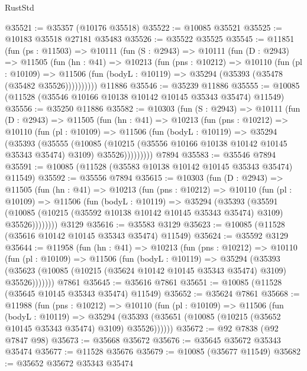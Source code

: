 \begin{lexlean}{RustStd}
\begin{coremodule}
@35521 := @35357 (@10176 @35518)
@35522 := @10085 @35521
@35525 := @10183 @35518 @27181 @35483
@35526 := @35522 @35525
@35545 := @11851
    (fun (ps : @11503) =>
    @10111
      (fun (S : @2943) =>
      @10111
        (fun (D : @2943) =>
        @11505
          (fun (hn : @41) =>
          @10213
            (fun (pns : @10212) =>
            @10110
              (fun (pl : @10109) =>
              @11506 (fun (bodyL : @10119) => @35294 (@35393 (@35478 (@35482 @35526))))))))))
    @11886
@35546 := @35239 @11886
@35555 := @10085 (@11528 (@35546 @10166 @10138 @10142 @10145 @35343 @35474) @11549)
@35556 := @35250 @11886
@35582 := @10303
    (fun (S : @2943) =>
    @10111
      (fun (D : @2943) =>
      @11505
        (fun (hn : @41) =>
        @10213
          (fun (pns : @10212) =>
          @10110
            (fun (pl : @10109) =>
            @11506
              (fun (bodyL : @10119) =>
              @35294
                (@35393
                  (@35555
                    (@10085
                      (@10215 (@35556 @10166 @10138 @10142 @10145 @35343 @35474) @3109)
                      @35526)))))))))
    @7894
@35583 := @35546 @7894
@35591 := @10085 (@11528 (@35583 @10138 @10142 @10145 @35343 @35474) @11549)
@35592 := @35556 @7894
@35615 := @10303
    (fun (D : @2943) =>
    @11505
      (fun (hn : @41) =>
      @10213
        (fun (pns : @10212) =>
        @10110
          (fun (pl : @10109) =>
          @11506
            (fun (bodyL : @10119) =>
            @35294
              (@35393
                (@35591
                  (@10085 (@10215 (@35592 @10138 @10142 @10145 @35343 @35474) @3109) @35526))))))))
    @3129
@35616 := @35583 @3129
@35623 := @10085 (@11528 (@35616 @10142 @10145 @35343 @35474) @11549)
@35624 := @35592 @3129
@35644 := @11958
    (fun (hn : @41) =>
    @10213
      (fun (pns : @10212) =>
      @10110
        (fun (pl : @10109) =>
        @11506
          (fun (bodyL : @10119) =>
          @35294
            (@35393
              (@35623 (@10085 (@10215 (@35624 @10142 @10145 @35343 @35474) @3109) @35526)))))))
    @7861
@35645 := @35616 @7861
@35651 := @10085 (@11528 (@35645 @10145 @35343 @35474) @11549)
@35652 := @35624 @7861
@35668 := @11988
    (fun (pns : @10212) =>
    @10110
      (fun (pl : @10109) =>
      @11506
        (fun (bodyL : @10119) =>
        @35294 (@35393 (@35651 (@10085 (@10215 (@35652 @10145 @35343 @35474) @3109) @35526))))))
@35672 := @92 @7838 (@92 @7847 @98)
@35673 := @35668 @35672
@35676 := @35645 @35672 @35343 @35474
@35677 := @11528 @35676
@35679 := @10085 (@35677 @11549)
@35682 := @35652 @35672 @35343 @35474

\end{coremodule}
\end{lexlean}
